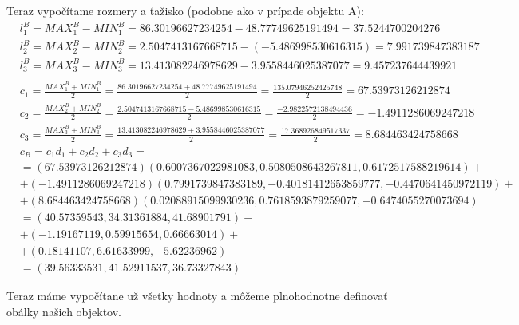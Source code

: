 \documentclass[a4paper]{article}
\begin{document}
	Teraz vypočítame rozmery a ťažisko (podobne ako v prípade objektu A):
	\begin{align*}
		&l_1^B = MAX_1^B - MIN_1^B = 86.30196627234254 - 48.77749625191494 = 37.5244700204276
		\\
		&l_2^B = MAX_2^B - MIN_2^B = 2.5047413167668715 - (-5.486998530616315) = 7.991739847383187
		\\
		&l_3^B = MAX_3^B - MIN_3^B = 13.413082246978629 - 3.9558446025387077 = 9.457237644439921
		\\
		\\
		&c_1 = \frac{ MAX_1^B + MIN_1^B }{2} = \frac{ 86.30196627234254 + 48.77749625191494 }{2} = \frac{ 135.07946252425748 }{2} = 67.53973126212874
		\\
		&c_2 = \frac{ MAX_2^B + MIN_2^B }{2} = \frac{ 2.5047413167668715 -5.486998530616315 }{2} = \frac{ -2.9822572138494436 }{2} = -1.4911286069247218
		\\
		&c_3 = \frac{ MAX_3^B + MIN_3^B }{2} = \frac{ 13.413082246978629 + 3.9558446025387077 }{2} = \frac{ 17.368926849517337 }{2} = 8.684463424758668
		\\
		&c_B = c_1 d_1 + c_2 d_2 + c_3 d_3 = 
		\\
		&=(67.53973126212874)(0.6007367022981083, 0.5080508643267811, 0.6172517588219614) + 
		\\
		&+(-1.4911286069247218)(0.7991739847383189, -0.40181412653859777, -0.4470641450972119) + 
		\\
		&+(8.684463424758668)(0.02088915099930236, 0.7618593879259077, -0.6474055270073694)  
		\\
		&=(40.57359543, 34.31361884, 41.68901791) + 
		\\
		&+(-1.19167119,  0.59915654,  0.66663014) + 
		\\
		&+(0.18141107,  6.61633999, -5.62236962) 
		\\
		&= (39.56333531, 41.52911537, 36.73327843) 
	\end{align*}

	Teraz máme vypočítane už všetky hodnoty a môžeme plnohodnotne definovať obálky našich objektov.
	
\end{document}
